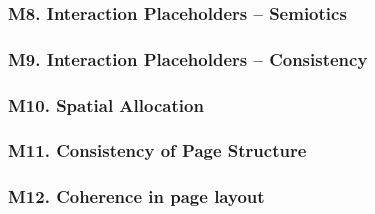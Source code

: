 \subsubsection*{M8. Interaction Placeholders – Semiotics}

\subsubsection*{M9. Interaction Placeholders – Consistency}
\subsubsection*{M10. Spatial Allocation}
\subsubsection*{M11. Consistency of Page Structure}
\subsubsection*{M12. Coherence in page layout}
 	 
 	 



